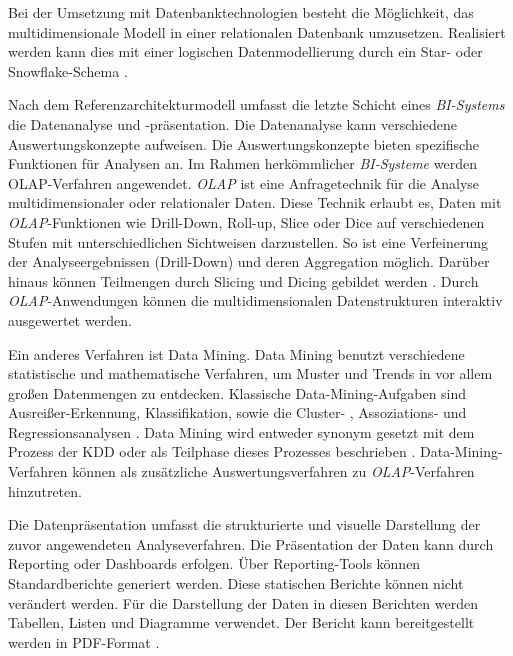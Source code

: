 Bei der Umsetzung mit Datenbanktechnologien besteht die Möglichkeit, das multidimensionale Modell in einer relationalen Datenbank umzusetzen.  
Realisiert werden kann dies mit einer logischen Datenmodellierung durch ein Star- oder Snowflake-Schema \cite[vgl.][S. 177 f.]{linden_geschaftsmodellbasierte_2016}.


Nach dem Referenzarchitekturmodell umfasst die letzte Schicht eines \textit{\acrshort{BI}-Systems} die Datenanalyse und -präsentation. Die Datenanalyse kann verschiedene Auswertungskonzepte aufweisen.
Die Auswertungskonzepte bieten spezifische Funktionen für Analysen an. Im Rahmen herkömmlicher \textit{\acrshort{BI}-Systeme} werden \acrfull{OLAP}-Verfahren angewendet. 
\textit{\acrshort{OLAP}} ist eine Anfragetechnik für die Analyse multidimensionaler oder relationaler Daten. Diese Technik erlaubt es, Daten mit \textit{\acrshort{OLAP}}-Funktionen 
wie Drill-Down, Roll-up, Slice oder Dice auf verschiedenen Stufen mit unterschiedlichen Sichtweisen darzustellen. So ist eine Verfeinerung der Analyseergebnissen (Drill-Down) und 
deren Aggregation möglich. Darüber hinaus können Teilmengen durch Slicing und Dicing gebildet werden \cite[vgl.][S. 283 f.]{abts_grundkurs_2017}. 
Durch \textit{\acrshort{OLAP}}-Anwendungen können die multidimensionalen Datenstrukturen interaktiv ausgewertet werden.

Ein anderes Verfahren ist Data Mining. Data Mining benutzt verschiedene statistische und mathematische Verfahren, um Muster und Trends in vor allem
großen Datenmengen zu entdecken. Klassische Data-Mining-Aufgaben sind Ausreißer-Erkennung, Klassifikation, sowie die Cluster- , Assoziations- und Regressionsanalysen \cite[vgl.][S. 15 ff.]{han_data_2012}.
Data Mining wird entweder synonym gesetzt mit dem Prozess der \acrfull{KDD} oder als Teilphase dieses Prozesses beschrieben
\cites[vgl.][6]{han_data_2012}[vgl.][S. 142 f.]{linden_geschaftsmodellbasierte_2016}.
Data-Mining-Verfahren können als zusätzliche Auswertungsverfahren zu \textit{\acrshort{OLAP}}-Verfahren hinzutreten.

Die Datenpräsentation umfasst die strukturierte und visuelle Darstellung der zuvor angewendeten Analyseverfahren.
Die Präsentation der Daten kann durch Reporting oder Dashboards erfolgen. Über Reporting-Tools können Standardberichte generiert werden. 
Diese statischen Berichte können nicht verändert werden. Für die Darstellung der Daten in diesen Berichten werden
Tabellen, Listen und Diagramme verwendet. Der Bericht kann bereitgestellt werden in PDF-Format \cite[vgl.][114]{bange_werkzeuge_2016}.


